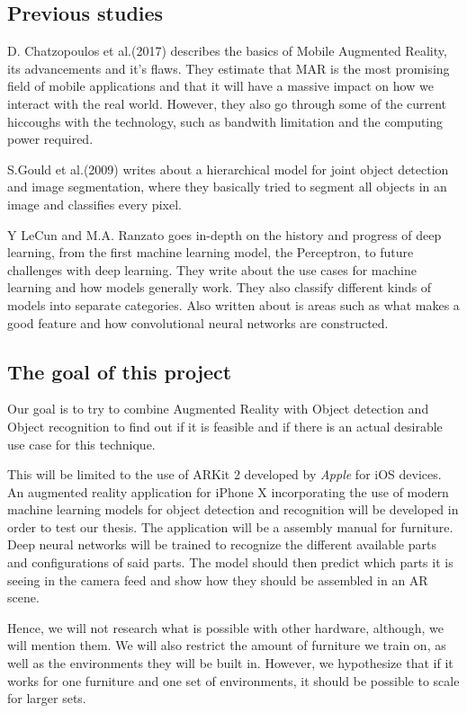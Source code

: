 \subsection{Previous studies}
\label{subsecPrevStud}
D. Chatzopoulos et al.(2017) describes the basics of Mobile Augmented Reality, its advancements and it's flaws. They estimate that MAR is the most promising field of mobile applications and that it will have a massive impact on how we interact with the real world. However, they also go through some of the current hiccoughs with the technology, such as bandwith limitation and the computing power required. 
\cite{MARS}

S.Gould et al.(2009) writes about a hierarchical model for joint object detection and image segmentation, where they basically tried to segment all objects in an image and classifies every pixel. 
\cite{NIPS2009_3766}


Y LeCun and M.A. Ranzato goes in-depth on the history and progress of deep learning, from the first machine learning model, the Perceptron, to future challenges with deep learning. They write about the use cases for machine learning and how models generally work. They also classify different kinds of models into separate categories. Also written about is areas such as what makes a good feature and how convolutional neural networks are constructed.
\cite{deepLearningTutorial}


\subsection{The goal of this project}
\label{subsecGoal}
Our goal is to try to combine Augmented Reality with Object detection and Object recognition to find out if it is feasible and if there is an actual desirable use case for this technique. 

This will be limited to the use of ARKit 2 developed by \textit{Apple} for iOS devices. An augmented reality application for iPhone X incorporating the use of modern machine learning models for object detection and recognition will be developed in order to test our thesis. The application will be a assembly manual for furniture. Deep neural networks will be trained to recognize the different available parts and configurations of said parts.  The model should then predict which parts it is seeing in the camera feed and show how they should be assembled in an AR scene. 

Hence, we will not research what is possible with other hardware, although, we will mention them. We will also restrict the amount of furniture we train on, as well as the environments they will be built in. However, we hypothesize that if it works for one furniture and one set of environments, it should be possible to scale for larger sets.

